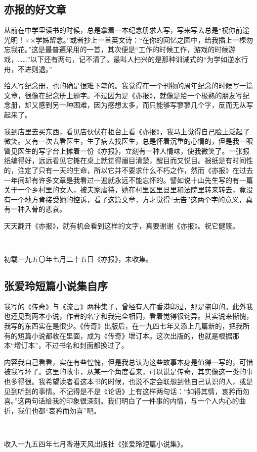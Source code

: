 \subsection{亦报的好文章}

\par 从前在中学里读书的时候，总是拿着一本纪念册求人写，写来写去总是“祝你前途光明！××学姊留念。”或者抄上一首英文诗：“在你的回忆之园中，给我插上一棵勿忘我花。”这是最普遍采用的一首，其次便是“工作的时候工作，游戏的时候游戏，……”以下还有两句，记不清了。最叫人扫兴的是那种训诫式的“为学如逆水行舟，不进则退。”
\par 给人写纪念册，也的确是很难下笔的。我觉得在一个刊物的周年纪念的时候写一篇文章，很像在纪念册上题字。不过因为是《亦报》，就像是给一个极熟的朋友写纪念册，却又感到另一种困难，因为感想太多，而只能够写寥寥几个字，反而无从写起来了。
\par 我到店里去买东西，看见店伙伏在柜台上看《亦报》，我马上觉得自己脸上泛起了微笑。又有一次去看医生，生了病去找医生，总是怀着沉重的心情的，但是我一眼瞥见医生的写字台上摊着一份《亦报》，立刻有一种人情味，使我微笑了。一张报纸编得好，远远看见它摊在桌上就觉得眉目清楚，醒目而又悦目。报纸是有时间性的，注定了只有一天的生命，所以它并不要求什么不朽之作，然而《亦报》在过去一年间却有许多文章是我看过一遍就永远不能忘怀的。譬如说十山先生写的有一篇关于一个乡村里的女人，被夫家虐待，她在村里区里县里和法院里转来转去，竟没有一个地方肯接受她的控诉，看了这篇文章，方才觉得“无告”这两个字的意义，真有一种入骨的悲哀。
\par 天天翻开《亦报》，就有机会看到这样的文字，真要谢谢《亦报》。祝它健康。
\par  
\par *初载一九五〇年七月二十五日《亦报》，未收集。




\subsection{张爱玲短篇小说集自序}


\par 我写的《传奇》与《流言》两种集子，曾经有人在香港印过，那是盗印的。此外我也还见到两本小说，作者的名字和我完全相同，看着觉得很诧异。其实说来惭愧，我写的东西实在是很少。《传奇》出版后，在一九四七年又添上几篇新的，把我所有的短篇小说都收在里面，成为《传奇》增订本。这次出版的，也就是根据那本“增订本”，不过书名和封面都换过了。
\par 内容我自己看看，实在有些惶愧，但是我总认为这些故事本身是值得一写的，可惜被我写坏了。这里的故事，从某一个角度看来，可以说是传奇，其实像这一类的事也多得很。我希望读者看这本书的时候，也说不定会联想到他自己认识的人，或是见到听到的事情。不记得是不是《论语》上有这样两句话：“如得其情，哀矜而勿喜。”这两句话给我的印象很深刻。我们明白了一件事的内情，与一个人内心的曲折，我们也都“哀矜而勿喜”吧。
\par {}
\par  
\par *收入一九五四年七月香港天风出版社《张爱玲短篇小说集》。



